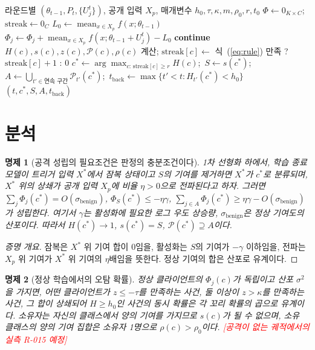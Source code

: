 \documentclass[10pt,a4paper]{article}
\newcommand{\todo}[1]{\textcolor{red}{[#1]}}
\newcommand{\method}{CCD}
\newtheorem{proposition}{명제}
\begin{document}
\begin{algorithm}[t]
\caption{\method{}: 학습 중 상쇄 연합 탐지}
\begin{algorithmic}[1]
\Require 라운드별 $(\theta_{t-1},P_t,\{U_j^t\})$, 공개 입력 $X_p$, 매개변수 $h_0,\tau,\kappa,m,\rho_0,r,t_0$
\State $\Phi\gets0_{K\times C}$; $\mathrm{streak}\gets0_C$
  \State $L_0\gets\operatorname{mean}_{x\in X_p}f(x;\theta_{t-1})$
   $\Phi_j\gets\Phi_j+\operatorname{mean}_{x\in X_p}f(x;\theta_{t-1}+U_j^t)-L_0$ \EndFor
   \textbf{continue} \EndIf
   $H(c),s(c),z(c),\mathcal{P}(c),\rho(c)$ 계산; $\mathrm{streak}[c]\gets$ 식~(\ref{eq:rule}) 만족 ? $\mathrm{streak}[c]+1$ : $0$ \EndFor
     \State $c^*\gets\arg\max_{c:\,\mathrm{streak}[c]\ge r}H(c)$;\ $S\gets s(c^*)$;\ $A\gets\bigcup_{t'\in\text{연속 구간}}\mathcal{P}_{t'}(c^*)$;\ $t_{\mathrm{back}}\gets\max\{t'<t:H_{t'}(c^*)<h_0\}$
     \State \Return $(t,c^*,S,A,t_{\mathrm{back}})$ 
  \EndIf
\EndFor
\end{algorithmic}
\end{algorithm}

\section{분석}\label{sec:analysis}
\begin{proposition}[공격 성립의 필요조건은 판정의 충분조건이다]
1차 선형화 하에서, 학습 종료 모델이 트리거 입력 $X^*$에서 잠복 상태이고 $S$의 기여를 제거하면 $X^*$가 $c^*$로 분류되며, $X^*$ 위의 상쇄가 공개 입력 $X_p$에 비율 $\eta>0$으로 전파된다고 하자. 그러면 $\sum_j\Phi_j(c^*)=O(\sigma_{\mathrm{benign}})$, $\Phi_S(c^*)\le-\eta\gamma$, $\sum_{j\in A}\Phi_j(c^*)\ge\eta\gamma-O(\sigma_{\mathrm{benign}})$가 성립한다. 여기서 $\gamma$는 활성화에 필요한 로그 우도 상승량, $\sigma_{\mathrm{benign}}$은 정상 기여도의 산포이다. 따라서 $H(c^*)\to1$, $s(c^*)=S$, $\mathcal{P}(c^*)\supseteq A$이다.
\end{proposition}
\begin{proof}[증명 개요]
잠복은 $X^*$ 위 기여 합이 0임을, 활성화는 $S$의 기여가 $-\gamma$ 이하임을, 전파는 $X_p$ 위 기여가 $X^*$ 위 기여의 $\eta$배임을 뜻한다. 정상 기여의 합은 산포로 유계이다.
\end{proof}
\begin{proposition}[정상 학습에서의 오탐 확률]
정상 클라이언트의 $\Phi_j(c)$가 독립이고 산포 $\sigma^2$을 가지면, 어떤 클라이언트가 $z\le-\tau$를 만족하는 사건, 둘 이상이 $z>\kappa$를 만족하는 사건, 그 합이 상쇄되어 $H\ge h_0$인 사건의 동시 확률은 각 꼬리 확률의 곱으로 유계이다. 소유자는 자신의 클래스에서 양의 기여를 가지므로 $s(c)$가 될 수 없으며, 소유 클래스의 양의 기여 집합은 소유자 1명으로 $\rho(c)>\rho_0$이다. \todo{공격이 없는 궤적에서의 실측 R-015 예정}
\end{proposition}
\end{document}
